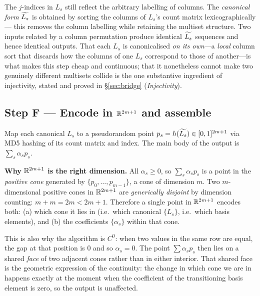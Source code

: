 The $j$-indices in $L_s$ still reflect the arbitrary labelling of columns.
The \emph{canonical form} $\widetilde{L_s}$ is obtained by sorting the columns of
$L_s$'s count matrix lexicographically — this removes the column labelling
while retaining the multiset structure.  Two inputs related by a column
permutation produce identical $\widetilde{L_s}$ sequences and hence identical
outputs.
%
That each $L_s$ is canonicalised \emph{on its own}---a \emph{local} column
sort that discards how the columns of one $L_s$ correspond to those of
another---is what makes this step cheap and continuous; that it nonetheless
cannot make two genuinely different multisets collide is the one substantive
ingredient of injectivity, stated and proved in \S\ref{sec:bridge}
(\emph{Injectivity}).

\subsection*{Step F — Encode in $\mathbb{R}^{2m+1}$ and assemble}

Map each canonical $L_s$ to a pseudorandom point $p_s = h(\widetilde{L_s})
\in [0,1]^{2m+1}$ via MD5 hashing of its count matrix and index.  The main
body of the output is $\sum_s \alpha_s p_s$.

\begin{tcolorbox}[keybox]
\textbf{Why $\mathbb{R}^{2m+1}$ is the right dimension.}
All $\alpha_s \ge 0$, so $\sum_s \alpha_s p_s$ is a point in the
\emph{positive cone} generated by $\{p_0,\ldots,p_{m-1}\}$, a cone of
dimension $m$.  Two $m$-dimensional positive cones in $\mathbb{R}^{2m+1}$ are
\emph{generically disjoint} by dimension counting: $m + m = 2m < 2m+1$.
Therefore a single point in $\mathbb{R}^{2m+1}$ encodes both:
(a) which cone it lies in (i.e.\ which canonical $\{L_s\}$, i.e.\ which basis
elements), and (b) the coefficients $\{\alpha_s\}$ within that cone.

This is also why the algorithm is $C^0$: when two values in the same row are
equal, the gap at that position is $0$ and so $\alpha_s = 0$.  The point
$\sum \alpha_s p_s$ then lies on a shared \emph{face} of two adjacent cones
rather than in either interior.  That shared face is the geometric expression
of the continuity: the change in which cone we are in happens exactly at the
moment when the coefficient of the transitioning basis element is zero, so the
output is unaffected.
\end{tcolorbox}

